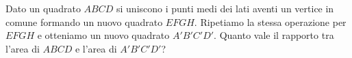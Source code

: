 \begin{multicols}{2}
	\centering

\begin{esercizio}
\label{ese:7.114}
Dato un quadrato $ABCD$ si uniscono i punti medi dei lati aventi un vertice in comune formando un nuovo quadrato $EFGH$. Ripetiamo la stessa operazione per $EFGH$ e otteniamo un nuovo quadrato $A'B'C'D'$. Quanto vale il rapporto tra l'area di $ABCD$ e l'area di $A'B'C'D'$?
\end{esercizio}

\end{multicols}
